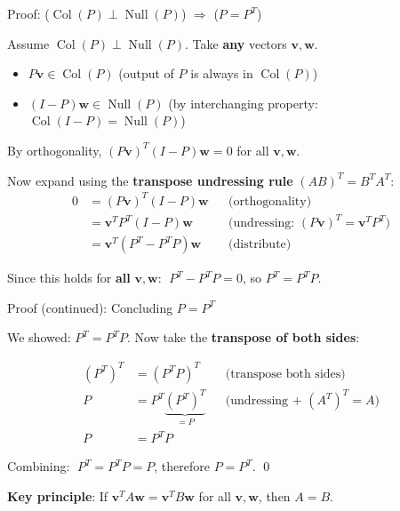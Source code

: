 \documentclass[10pt]{beamer}
\theoremstyle{definition}
\newcommand{\x}[1]{\alert{\textbf{#1}}}
\begin{document}
\begin{frame}{Proof: ($\operatorname{Col}(P) \perp \operatorname{Null}(P)$) $\Rightarrow$ ($P = P^T$)}

Assume $\operatorname{Col}(P) \perp \operatorname{Null}(P)$. Take \x{any} vectors $\mathbf{v}, \mathbf{w}$.

\vspace{0.5em}

\begin{itemize}
\item $P\mathbf{v} \in \operatorname{Col}(P)$ \quad (output of $P$ is always in $\operatorname{Col}(P)$)
\item $(I - P)\mathbf{w} \in \operatorname{Null}(P)$ \quad (by interchanging property: $\operatorname{Col}(I-P) = \operatorname{Null}(P)$)
\end{itemize}

\vspace{0.5em}

By orthogonality, $(P\mathbf{v})^T (I - P)\mathbf{w} = 0$ for all $\mathbf{v}, \mathbf{w}$.

Now expand using the \x{transpose undressing rule} $(AB)^T = B^T A^T$:
\begin{align*}
0 &= (P\mathbf{v})^T (I - P)\mathbf{w} & &\text{(orthogonality)}\\
  &= \mathbf{v}^T P^T (I - P) \mathbf{w} & &\text{(undressing: $(P\mathbf{v})^T = \mathbf{v}^T P^T$)}\\
  &= \mathbf{v}^T (P^T - P^T P) \mathbf{w} & &\text{(distribute)}
\end{align*}

Since this holds for \x{all} $\mathbf{v}, \mathbf{w}$: $\; P^T - P^T P = 0$, so $P^T = P^T P$.

\end{frame}

\begin{frame}{Proof (continued): Concluding $P = P^T$}

We showed: $P^T = P^T P$. Now take the \x{transpose of both sides}:

\begin{align*}
(P^T)^T &= (P^T P)^T & &\text{(transpose both sides)} \\
P &= P^T \underbrace{(P^T)^T}_{= P} & &\text{(undressing + $(A^T)^T = A$)} \\
P &= P^T P & &
\end{align*}

Combining: $\;P^T = P^T P = P$, therefore $P = P^T$. \qed

\vspace{0.5em}

\x{Key principle}: If $\mathbf{v}^T A \mathbf{w} = \mathbf{v}^T B \mathbf{w}$ for all $\mathbf{v}, \mathbf{w}$, then $A = B$.

\end{frame}
\end{document}
